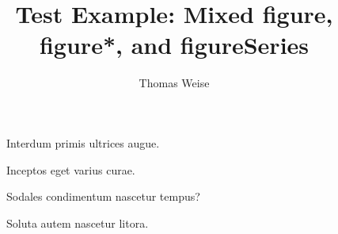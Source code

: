 \documentclass{IEEEtran}%
\begin{document}
%
%
\title{Test Example: Mixed figure, figure*, and figureSeries}%
\author{Thomas Weise}%
\maketitle%
%
\begin{figure*}%
%
\caption{Interdum primis ultrices augue.}%
\end{figure*}
%
\lipsum[1-7]%
%
\begin{figure*}%
%
\caption{Inceptos eget varius curae.}%
\end{figure*}%
%
%
%
\begin{figure}%
%
\caption{Sodales condimentum nascetur tempus?}%
\end{figure}%
%
\begin{figure}%
%
\caption{Soluta autem nascetur litora.}%
\end{figure}%
%
\lipsum[14]%
%
\end{document}
